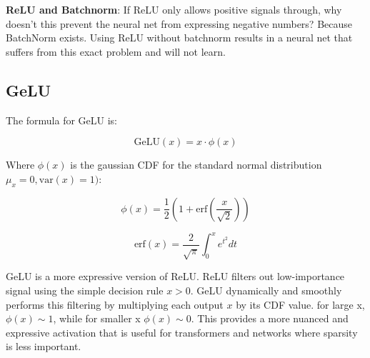 \documentclass[12pt]{article}
\begin{document}
\textbf{ReLU and Batchnorm}: If ReLU only allows positive signals through, why doesn't this prevent the neural net from expressing negative numbers? Because BatchNorm exists. Using ReLU without batchnorm results in a neural net that suffers from this exact problem and will not learn.

\subsection{GeLU}
The formula for GeLU is: 

\[\text{GeLU}(x) = x \cdot \phi(x)\]

Where \(\phi(x)\) is the gaussian CDF for the standard normal distribution \(\mu_x=0, \text{var}(x)=1)\):

\[\phi(x) = \frac{1}{2}\left(1 + \text{erf}(\frac{x}{\sqrt{2}})\right)\]

\[\text{erf}(x) =\frac{2}{\sqrt{\pi}} \int_0^xe^{t^2}dt\]


GeLU is a more expressive version of ReLU. ReLU filters out low-importance signal using the simple decision rule \(x>0\). GeLU dynamically and smoothly performs this filtering by multiplying each output \(x\) by its CDF value. for large x, \(\phi(x) \sim 1\), while for smaller x \(\phi(x) \sim 0\). This provides a more nuanced and expressive activation that is useful for transformers and networks where sparsity is less important. \\
\end{document}
